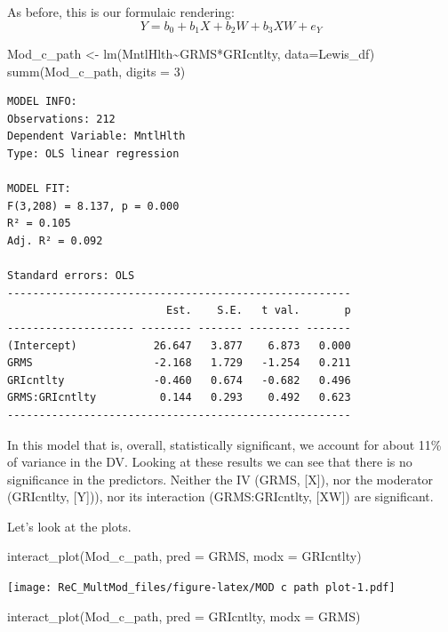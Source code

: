 \documentclass[
  11pt,
]{book}
\newenvironment{Shaded}{\begin{snugshade}}{\end{snugshade}}
\newcommand{\AttributeTok}[1]{\textcolor[rgb]{0.77,0.63,0.00}{#1}}
\newcommand{\DecValTok}[1]{\textcolor[rgb]{0.00,0.00,0.81}{#1}}
\newcommand{\FunctionTok}[1]{\textcolor[rgb]{0.00,0.00,0.00}{#1}}
\newcommand{\NormalTok}[1]{#1}
\newcommand{\OtherTok}[1]{\textcolor[rgb]{0.56,0.35,0.01}{#1}}
\newcommand{\SpecialCharTok}[1]{\textcolor[rgb]{0.00,0.00,0.00}{#1}}
\begin{document}
As before, this is our formulaic rendering:\\
\[Y=b_{0}+b_{1}X+b_{2}W+b_{3}XW+e_{Y}\]

\begin{Shaded}
\begin{Highlighting}[]
\NormalTok{Mod\_c\_path }\OtherTok{\textless{}{-}} \FunctionTok{lm}\NormalTok{(MntlHlth}\SpecialCharTok{\textasciitilde{}}\NormalTok{GRMS}\SpecialCharTok{*}\NormalTok{GRIcntlty, }\AttributeTok{data=}\NormalTok{Lewis\_df)}
\FunctionTok{summ}\NormalTok{(Mod\_c\_path, }\AttributeTok{digits =} \DecValTok{3}\NormalTok{)}
\end{Highlighting}
\end{Shaded}

\begin{verbatim}
MODEL INFO:
Observations: 212
Dependent Variable: MntlHlth
Type: OLS linear regression 

MODEL FIT:
F(3,208) = 8.137, p = 0.000
R² = 0.105
Adj. R² = 0.092 

Standard errors: OLS
------------------------------------------------------
                         Est.    S.E.   t val.       p
-------------------- -------- ------- -------- -------
(Intercept)            26.647   3.877    6.873   0.000
GRMS                   -2.168   1.729   -1.254   0.211
GRIcntlty              -0.460   0.674   -0.682   0.496
GRMS:GRIcntlty          0.144   0.293    0.492   0.623
------------------------------------------------------
\end{verbatim}

In this model that is, overall, statistically significant, we account for about 11\% of variance in the DV. Looking at these results we can see that there is no significance in the predictors. Neither the IV (GRMS, {[}X{]}), nor the moderator (GRIcntlty, {[}Y{]})), nor its interaction (GRMS:GRIcntlty, {[}XW{]}) are significant.

Let's look at the plots.

\begin{Shaded}
\begin{Highlighting}[]
\FunctionTok{interact\_plot}\NormalTok{(Mod\_c\_path, }\AttributeTok{pred =}\NormalTok{ GRMS, }\AttributeTok{modx =}\NormalTok{ GRIcntlty)}
\end{Highlighting}
\end{Shaded}

\texttt{[image: ReC\_MultMod\_files/figure-latex/MOD c path plot-1.pdf]}

\begin{Shaded}
\begin{Highlighting}[]
\FunctionTok{interact\_plot}\NormalTok{(Mod\_c\_path, }\AttributeTok{pred =}\NormalTok{ GRIcntlty, }\AttributeTok{modx =}\NormalTok{ GRMS)}
\end{Highlighting}
\end{Shaded}
\end{document}
